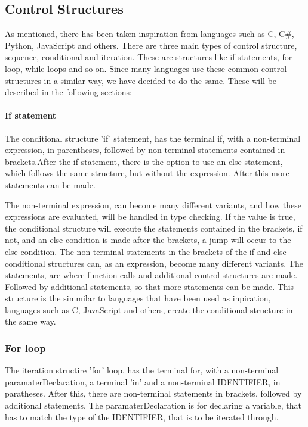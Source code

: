 \subsection{Control Structures}
As mentioned, there has been taken inspiration from languages such as C, C\#, Python, JavaScript and others. There are three main types of control structure, sequence, conditional and iteration. These are structures like if statements, for loop, while loops and so on. Since many languages use these common control structures in a similar way, we have decided to do the same. These will be described in the following sections:

\paragraph*{If statement}
The conditional structure 'if' statement, has the terminal if, with a non-terminal expression, in parentheses, followed by non-terminal statements contained in brackets.After the if statement, there is the option to use an else statement, which follows the same structure, but without the expression. After this more statements can be made.

The non-terminal expression, can become many different variants, and how these expressions are evaluated, will be handled in type checking. If the value is true, the conditional structure will execute the statements contained in the brackets, if not, and an else condition is made after the brackets, a jump will occur to the else condition.
The non-terminal statements in the brackets of the if and else conditional structures can, as an expression, become many different variants. The statements, are where function calls and additional control structures are made.
Followed by additional statements, so that more statements can be made.
This structure is the simmilar to languages that have been used as inpiration, languages such as C, JavaScript and others, create the conditional structure in the same way.


\subsubsection{For loop}
The iteration structire 'for' loop, has the terminal for, with a non-terminal paramaterDeclaration, a terminal 'in' and a non-terminal IDENTIFIER, in paratheses. After this, there are non-terminal statements in brackets, followed by additional statements.
The paramaterDeclaration is for declaring a variable, that has to match the type of the IDENTIFIER, that is to be iterated through.

